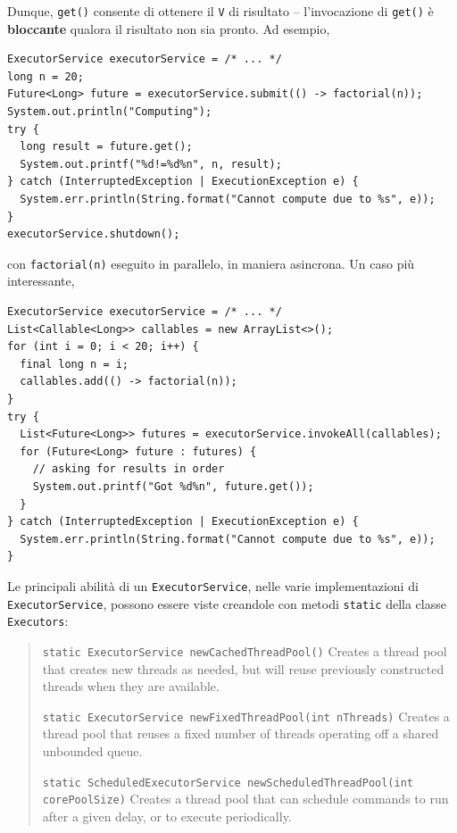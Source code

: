 \documentclass[\fontsizeclass,twocolumn]{\classname}
\theoremstyle{definition}
\theoremstyle{definition}
\begin{document}
Dunque, \texttt{get()} consente di ottenere il \texttt{V} di risultato --
l'invocazione di \texttt{get()} è \textbf{bloccante} qualora il risultato non
sia pronto. Ad esempio,

\begin{lstlisting}
ExecutorService executorService = /* ... */
long n = 20;
Future<Long> future = executorService.submit(() -> factorial(n));
System.out.println("Computing");
try {
  long result = future.get();
  System.out.printf("%d!=%d%n", n, result);
} catch (InterruptedException | ExecutionException e) {
  System.err.println(String.format("Cannot compute due to %s", e));
}
executorService.shutdown();
\end{lstlisting}

con \texttt{factorial(n)} eseguito in parallelo, in maniera asincrona.
Un caso più interessante,

\begin{lstlisting}
ExecutorService executorService = /* ... */
List<Callable<Long>> callables = new ArrayList<>();
for (int i = 0; i < 20; i++) {
  final long n = i;
  callables.add(() -> factorial(n));
}
try {
  List<Future<Long>> futures = executorService.invokeAll(callables);
  for (Future<Long> future : futures) {
    // asking for results in order
    System.out.printf("Got %d%n", future.get());
  }
} catch (InterruptedException | ExecutionException e) {
  System.err.println(String.format("Cannot compute due to %s", e));
}
\end{lstlisting}

Le principali abilità di un \texttt{ExecutorService}, nelle varie
implementazioni di \texttt{ExecutorService}, possono essere viste creandole con
metodi \texttt{static} della classe \texttt{Executors}:

\begin{quote}
    \footnotesize{\texttt{static ExecutorService 	newCachedThreadPool()} 	Creates a thread pool that creates new threads as needed, but will reuse previously constructed threads when they are available.

\texttt{static ExecutorService 	newFixedThreadPool(int nThreads)} 	Creates a thread pool that reuses a fixed number of threads operating off a shared unbounded queue.

\texttt{static ScheduledExecutorService 	newScheduledThreadPool(int corePoolSize)} 	Creates a thread pool that can schedule commands to run after a given delay, or to execute periodically.}
\end{quote}
\end{document}
